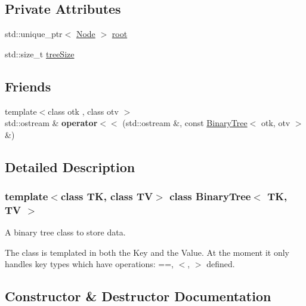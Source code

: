 \subsection*{Private Attributes}
\begin{DoxyCompactItemize}
\item 
std\+::unique\+\_\+ptr$<$ \mbox{\hyperlink{structBinaryTree_1_1Node}{Node}} $>$ \mbox{\hyperlink{classBinaryTree_a787363fcf3a4109694808f03b3793614}{root}}
\item 
std\+::size\+\_\+t \mbox{\hyperlink{classBinaryTree_a95c64190503d0c8f5f7878bfb4aaf841}{tree\+Size}}
\end{DoxyCompactItemize}
\subsection*{Friends}
\begin{DoxyCompactItemize}
\item 
\mbox{\label{classBinaryTree_a9352b744993dfd3558fcd8c7dcba4e20}} 
{\footnotesize template$<$class otk , class otv $>$ }\\std\+::ostream \& {\bfseries operator$<$$<$} (std\+::ostream \&, const \mbox{\hyperlink{classBinaryTree}{Binary\+Tree}}$<$ otk, otv $>$ \&)
\end{DoxyCompactItemize}


\subsection{Detailed Description}
\subsubsection*{template$<$class TK, class TV$>$\newline
class Binary\+Tree$<$ T\+K, T\+V $>$}

A binary tree class to store data. 

The class is templated in both the Key and the Value. At the moment it only handles key types which have operations\+: ==, $<$, $>$ defined. 

\subsection{Constructor \& Destructor Documentation}
\mbox{\label{classBinaryTree_a18b4981a8d885a296b144462729c0679}} 

